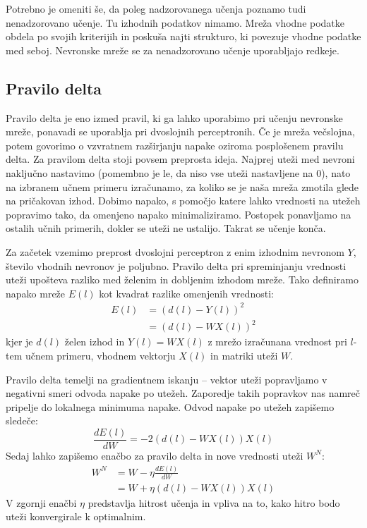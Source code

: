 \documentclass[mat1]{fmfdelo}
\begin{document}
Potrebno je omeniti še, da poleg nadzorovanega učenja poznamo tudi nenadzorovano učenje. Tu izhodnih podatkov nimamo. Mreža vhodne podatke obdela po svojih kriterijih in poskuša najti strukturo, ki povezuje vhodne podatke med seboj. Nevronske mreže se za nenadzorovano učenje uporabljajo redkeje.
\subsection{Pravilo delta}
Pravilo delta je eno izmed pravil, ki ga lahko uporabimo pri učenju nevronske mreže, ponavadi se uporablja pri dvoslojnih perceptronih. Če je mreža večslojna, potem govorimo o vzvratnem razširjanju napake oziroma posplošenem pravilu delta. Za pravilom delta stoji povsem preprosta ideja. Najprej uteži med nevroni naključno nastavimo (pomembno je le, da niso vse uteži nastavljene na 0), nato na izbranem učnem primeru izračunamo, za koliko se je naša mreža zmotila glede na pričakovan izhod. Dobimo napako, s pomočjo katere lahko vrednosti na utežeh popravimo tako, da omenjeno napako minimaliziramo. Postopek ponavljamo na ostalih učnih primerih, dokler se uteži ne ustalijo. Takrat se učenje konča.

Za začetek vzemimo preprost dvoslojni perceptron z enim izhodnim nevronom $Y$, število vhodnih nevronov je poljubno. Pravilo delta pri spreminjanju vrednosti uteži upošteva razliko med želenim in dobljenim izhodom mreže. Tako definiramo napako mreže $E(l)$ kot kvadrat razlike omenjenih vrednosti:
%
\begin{equation}
\begin{aligned}
E(l) &= (d(l)-Y(l))^2 \\
&= (d(l)-WX(l))^2
\label{eq:napaka}
\end{aligned}
\end{equation}
%
kjer je $d(l)$ želen izhod in $Y(l)= WX(l)$ z mrežo izračunana vrednost pri $l$-tem učnem primeru, vhodnem vektorju $X(l)$ in matriki uteži $W$.

Pravilo delta temelji na gradientnem iskanju -- vektor uteži popravljamo v negativni smeri odvoda napake po utežeh. Zaporedje takih popravkov nas namreč pripelje do lokalnega minimuma napake. Odvod napake po utežeh zapišemo sledeče:
%
\begin{equation*}
\frac{dE(l)}{dW}= -2(d(l)-WX(l))X(l)
\end{equation*}
%
Sedaj lahko zapišemo enačbo za pravilo delta in nove vrednosti uteži $W^{N}$:
%
\begin{equation}
\begin{aligned}
W^{N} &= W - \eta\frac{dE(l)}{dW} \\
&= W + \eta(d(l)-WX(l))X(l)
\label{utezi}
\end{aligned}
\end{equation}
%
V zgornji enačbi $\eta$ predstavlja hitrost učenja in vpliva na to, kako hitro bodo uteži konvergirale k optimalnim. 
%
\\
\end{document}
